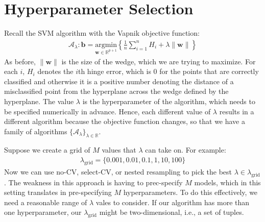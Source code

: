 \documentclass[12pt, a4paper]{article}
\theoremstyle{definition}
\begin{document}
	\section*{Hyperparameter Selection}
	Recall the SVM algorithm with the Vapnik objective function:
	\begin{align*}
		\mathcal{A}_{\lambda}:\bm{b} = \underset{\bm{w}\in\mathbb{R}^{p+1}}{\text{argmin}}
		\left\{
		\frac{1}{n}\sum_{i=1}^{n}H_i + 
		\lambda \|\bm{w}\|
		\right\}
	\end{align*}
	As before, $\|\bm{w}\|$ is the size of the wedge, which we are trying
	to maximize. For each $i$, $H_i$ denotes the $i$th hinge error, which is $0$
	for the points that are correctly classified and otherwise it is a positive
	number denoting the distance of a misclassified point from the hyperplane across
	the wedge defined by the hyperplane. The value $\lambda$ is the hyperparameter
	of the algorithm, which needs to be specified numerically in advance. Hence,
	each different value of $\lambda$ results in a different algorithm because
	the objective function changes, so that we have a family of algorithms
	$\{\mathcal{A}_\lambda\}_{\lambda\in\mathbb{R}}$.
	
	Suppose we create a grid of $M$ values that $\lambda$ can take on. For example:
	\begin{align*}
		\lambda_{\text{grid}} = \{
		0.001, 0.01, 0.1, 1, 10, 100
		\}
	\end{align*}
	Now we can use no-CV, select-CV, or nested resampling to pick the best
	$\lambda\in \lambda_{\text{grid}}$. The weakness in this approach is having
	to prec-specify $M$ models, which in this setting translates in pre-specifying
	$M$ hyperparameters. To do this effectively, we need a reasonable range of $\lambda$
	vales to consider. If our algorithm has more than one hyperparameter,
	our $\lambda_{\text{grid}}$ might be two-dimensional, i.e., a set of tuples.
	\pagebreak
	\printbibliography
\end{document}
